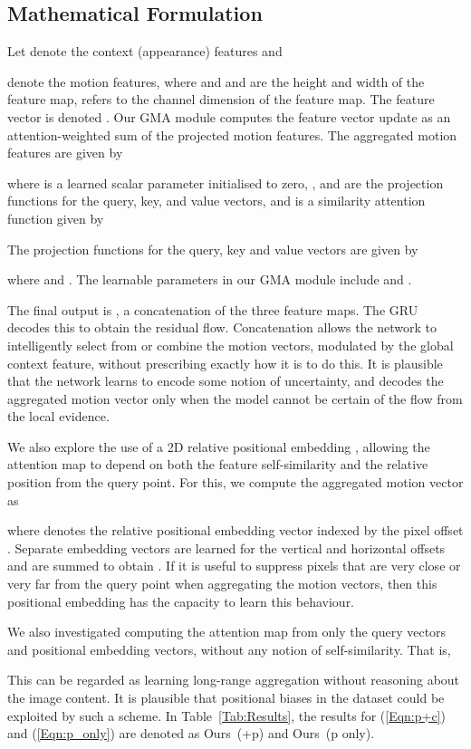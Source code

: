\documentclass[10pt,twocolumn,letterpaper]{article}
\begin{document}
\subsection{Mathematical Formulation}
Let  denote the context (appearance) features and 
 
denote the motion features, where  and  and  are the height
and width of the feature map,  refers to the channel dimension of the feature map. 
The  feature vector is denoted . 
Our GMA module computes the feature vector update as an attention-weighted sum
of the projected motion features. The aggregated motion features are given by

where  is a learned scalar parameter initialised to zero,
,  and  are the projection functions for the query, key, and value vectors,
and  is a similarity attention function given by

The projection functions for the query, key and value vectors are given by

where  and 
. The learnable parameters in our
GMA module include  and . 

The final output is , a concatenation of the three feature maps.
The GRU decodes this to obtain the residual flow.
Concatenation allows the network to intelligently select from or combine the motion vectors,
modulated by the global context feature, without prescribing exactly how it is to do this.
It is plausible that the network learns to encode some notion of uncertainty, and decodes
the aggregated motion vector only when the model cannot be certain of the flow
from the local evidence.

We also explore the use of a 2D relative positional embedding \cite{bello2019attention}, allowing the attention map
to depend on both the feature self-similarity and the relative position from the query point.
For this, we compute the aggregated motion vector as

where  denotes the relative positional embedding vector indexed by the pixel offset .
Separate embedding vectors are learned for the vertical and horizontal offsets and are summed to obtain .
If it is useful to suppress pixels that are very close or very far from the query point when aggregating the motion vectors,
then this positional embedding has the capacity to learn this behaviour.

We also investigated computing the attention map from only the query vectors and
positional embedding vectors, without any notion of self-similarity. That is,

This can be regarded as learning long-range aggregation without reasoning about the image content.
It is plausible that positional biases in the dataset could be exploited by such a scheme.
In Table~\ref{Tab:Results}, the results for (\ref{Eqn:p+c}) and (\ref{Eqn:p_only}) are denoted as
Ours~(+p) and Ours~(p only).
\end{document}
